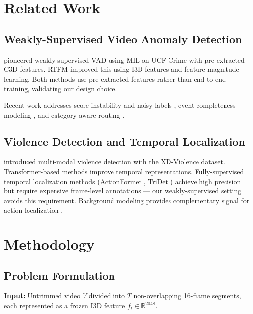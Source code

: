 \documentclass[11pt]{article}
\begin{document}
\section{Related Work}

\subsection{Weakly-Supervised Video Anomaly Detection}

\citet{sultani2018real} pioneered weakly-supervised VAD using MIL on UCF-Crime
with pre-extracted C3D features.
RTFM \citep{tian2021weakly} improved this using I3D features and feature magnitude
learning.
Both methods use pre-extracted features rather than end-to-end training, validating
our design choice.

Recent work addresses score instability and noisy labels
\citep{xu2025dss, dalvi2025dakd},
event-completeness modeling \citep{wang2025lecvad},
and category-aware routing \citep{damicantonio2025gsmoe}.

\subsection{Violence Detection and Temporal Localization}

\citet{wu2020not} introduced multi-modal violence detection with the XD-Violence
dataset.
Transformer-based methods \citep{wu2023surveillance} improve temporal
representations.
Fully-supervised temporal localization methods
(ActionFormer \citep{zhang2022actionformer}, TriDet \citep{shi2023tridet})
achieve high precision but require expensive frame-level annotations --- our
weakly-supervised setting avoids this requirement.
Background modeling provides complementary signal for action localization
\citep{nguyen2019weakly}.

\section{Methodology}

\subsection{Problem Formulation}

\textbf{Input:} Untrimmed video $V$ divided into $T$ non-overlapping 16-frame
segments, each represented as a frozen I3D feature $f_t \in \mathbb{R}^{2048}$.
\end{document}
